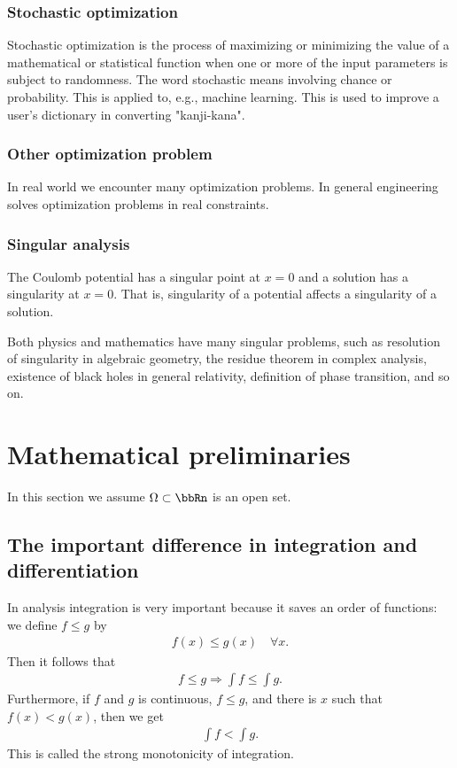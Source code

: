 \documentclass[openany, a4paper, oneside]{jsbook}
\begin{document}
\subsubsection{Stochastic optimization}

Stochastic optimization is the process of maximizing or minimizing
the value of a mathematical or statistical function when one or more of the input parameters is subject to randomness.
The word stochastic means involving chance or probability.
This is applied to, e.g., machine learning.
This is used to improve a user's dictionary in converting "kanji-kana".
\subsubsection{Other optimization problem}

In real world we encounter many optimization problems.
In general engineering solves optimization problems in real constraints.
\subsubsection{Singular analysis}

The Coulomb potential has a singular point at $x = 0$ and a solution has a singularity at $x = 0$.
That is, singularity of a potential affects a singularity of a solution.

Both physics and mathematics have many singular problems,
such as resolution of singularity in algebraic geometry,
the residue theorem in complex analysis,
existence of black holes in general relativity, definition of phase transition, and so on.
\section{Mathematical preliminaries}

In this section we assume $\Omega \subset \bbRn$ is an open set.
\subsection{The important difference in integration and differentiation}

In analysis integration is very important because it saves an order of functions:
we define $f \leq g$ by
\begin{align}
 f (x) \leq g (x) \quad \forall x.
\end{align}
Then it follows that
\begin{align}
 f \leq g
 \Rightarrow
 \int f \leq \int g.
\end{align}
Furthermore, if $f$ and $g$ is continuous, $f \leq g$, and there is $x$ such that $f (x) < g (x)$, then we get
\begin{align}
 \int f < \int g.
\end{align}
This is called the strong monotonicity of integration.
\end{document}
